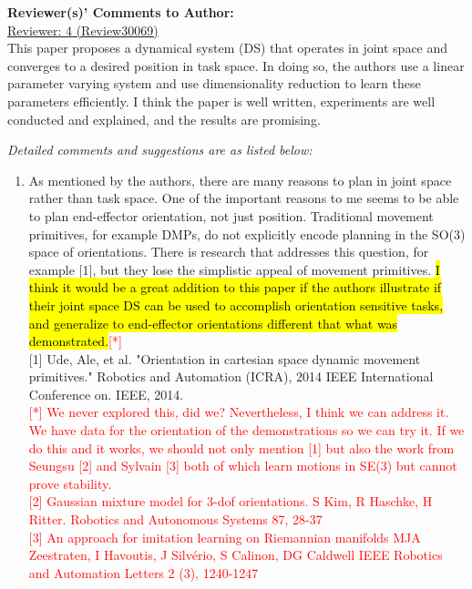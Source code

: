 \documentclass[10pt,stdletter,dateno]{newlfm}
\begin{document}
\begin{newlfm}

\textbf{Reviewer(s)' Comments to Author:}\\

\underline{Reviewer: 4 (Review30069)}\\
This paper proposes a dynamical system (DS) that operates in joint
space and converges to a desired position in task space. In doing so,
the authors use a linear parameter varying system and use
dimensionality reduction to learn these parameters efficiently. I think
the paper is well written, experiments are well conducted and
explained, and the results are promising. 

\textit{Detailed comments and
suggestions are as listed below:}
\begin{enumerate}
\item As mentioned by the authors, there are many reasons to plan in joint
space rather than task space. One of the important reasons to me seems
to be able to plan end-effector orientation, not just position.
Traditional movement primitives, for example DMPs, do not explicitly
encode planning in the SO(3) space of orientations. There is research
that addresses this question, for example [1], but they lose the
simplistic appeal of movement primitives. \hl{I think it would be a great
addition to this paper if the authors illustrate if their joint space
DS can be used to accomplish orientation sensitive tasks, and
generalize to end-effector orientations different that what was
demonstrated.}\textcolor{red}{[*]} \\

[1] Ude, Ale, et al. "Orientation in cartesian space dynamic movement
primitives." Robotics and Automation (ICRA), 2014 IEEE International
Conference on. IEEE, 2014.\\

\textcolor{red}{[*] We never explored this, did we? Nevertheless, I think we can address it. We have data for the orientation of the demonstrations so we can try it. If we do this and it works, we should not only mention [1] but also the work from Seungsu [2] and Sylvain [3] both of which learn motions in SE(3) but cannot prove stability.}\\
\textcolor{red}{[2] Gaussian mixture model for 3-dof orientations. S Kim, R Haschke, H Ritter. Robotics and Autonomous Systems 87, 28-37}\\
\textcolor{red}{[3] An approach for imitation learning on Riemannian manifolds
MJA Zeestraten, I Havoutis, J Silvério, S Calinon, DG Caldwell
IEEE Robotics and Automation Letters 2 (3), 1240-1247}\\


\end{enumerate}
\end{newlfm}
\end{document}
